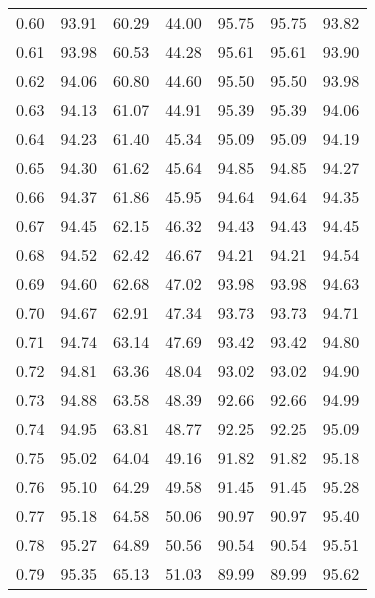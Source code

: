 \begin{tabular}{|c|c|c|c|c|c|c|}
      0.60 &     93.91 &     60.29 &      44.00 &   95.75 &      95.75 &         93.82 \\
      0.61 &     93.98 &     60.53 &      44.28 &   95.61 &      95.61 &         93.90 \\
      0.62 &     94.06 &     60.80 &      44.60 &   95.50 &      95.50 &         93.98 \\
      0.63 &     94.13 &     61.07 &      44.91 &   95.39 &      95.39 &         94.06 \\
      0.64 &     94.23 &     61.40 &      45.34 &   95.09 &      95.09 &         94.19 \\
      0.65 &     94.30 &     61.62 &      45.64 &   94.85 &      94.85 &         94.27 \\
      0.66 &     94.37 &     61.86 &      45.95 &   94.64 &      94.64 &         94.35 \\
      0.67 &     94.45 &     62.15 &      46.32 &   94.43 &      94.43 &         94.45 \\
      0.68 &     94.52 &     62.42 &      46.67 &   94.21 &      94.21 &         94.54 \\
      0.69 &     94.60 &     62.68 &      47.02 &   93.98 &      93.98 &         94.63 \\
      0.70 &     94.67 &     62.91 &      47.34 &   93.73 &      93.73 &         94.71 \\
      0.71 &     94.74 &     63.14 &      47.69 &   93.42 &      93.42 &         94.80 \\
      0.72 &     94.81 &     63.36 &      48.04 &   93.02 &      93.02 &         94.90 \\
      0.73 &     94.88 &     63.58 &      48.39 &   92.66 &      92.66 &         94.99 \\
      0.74 &     94.95 &     63.81 &      48.77 &   92.25 &      92.25 &         95.09 \\
      0.75 &     95.02 &     64.04 &      49.16 &   91.82 &      91.82 &         95.18 \\
      0.76 &     95.10 &     64.29 &      49.58 &   91.45 &      91.45 &         95.28 \\
      0.77 &     95.18 &     64.58 &      50.06 &   90.97 &      90.97 &         95.40 \\
      0.78 &     95.27 &     64.89 &      50.56 &   90.54 &      90.54 &         95.51 \\
      0.79 &     95.35 &     65.13 &      51.03 &   89.99 &      89.99 &         95.62 \\

\end{tabular}
